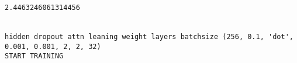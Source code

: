 \documentclass[11pt]{article}
\begin{document}
    \begin{center}
    \end{center}
    { \hspace*{\fill} \\}
    
    \begin{center}
    \end{center}
    { \hspace*{\fill} \\}
    
    \begin{Verbatim}[commandchars=\\\{\}]
2.4463246061314456


hidden dropout attn leaning weight layers batchsize (256, 0.1, 'dot', 0.001, 0.001, 2, 2, 32)
START TRAINING



    \end{Verbatim}

    \begin{center}
    \end{center}
    { \hspace*{\fill} \\}
    
    \begin{center}
    \end{center}
    { \hspace*{\fill} \\}
    
    \begin{center}
    \end{center}
    { \hspace*{\fill} \\}
    
    \begin{center}
    \end{center}
    { \hspace*{\fill} \\}
    
    \begin{center}
    \end{center}
    { \hspace*{\fill} \\}
    
\end{document}
